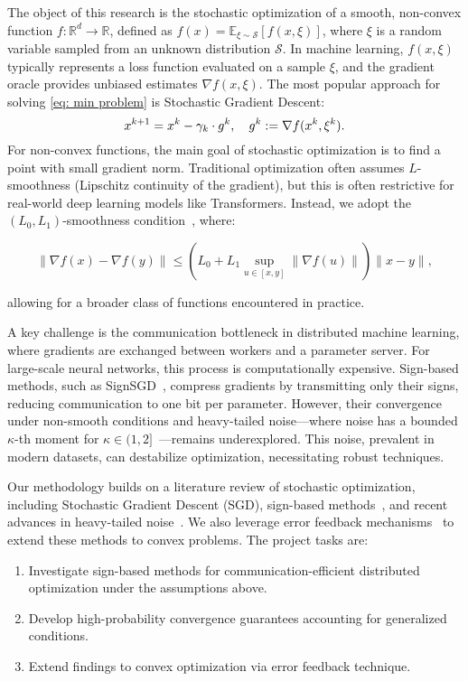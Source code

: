 The object of this research is the stochastic optimization of a smooth, non-convex function $f: \mathbb{R}^d \to \mathbb{R}$, defined as $f(x) = \mathbb{E}_{\xi \sim \mathcal{S}} [f(x, \xi)]$, where $\xi$ is a random variable sampled from an unknown distribution $\mathcal{S}$. In machine learning, $f(x, \xi)$ typically represents a loss function evaluated on a sample $\xi$, and the gradient oracle provides unbiased estimates $\nabla f(x, \xi)$.
The most popular approach for solving \eqref{eq: min problem} is Stochastic Gradient Descent:
\begin{equation}
    x^{k+1} = x^k - \gamma_k \cdot  g^k, \quad g^k := \nabla f (x^k, \xi^k). \notag \label{eq: sgd intro}
\end{equation}
For non-convex functions, the main goal of stochastic optimization is to find a point with small gradient norm. Traditional optimization often assumes $L$-smoothness (Lipschitz continuity of the gradient), but this is often restrictive for real-world deep learning models like Transformers. Instead, we adopt the $(L_0, L_1)$-smoothness condition~\cite{gorbunov}, where:

\[
\|\nabla f(x) - \nabla f(y)\| \leq \left(L_0 + L_1 \sup_{u \in [x,y]} \|\nabla f(u)\|\right) \|x - y\|,
\]

allowing for a broader class of functions encountered in practice.

A key challenge is the communication bottleneck in distributed machine learning, where gradients are exchanged between workers and a parameter server. For large-scale neural networks, this process is computationally expensive. Sign-based methods, such as SignSGD~\cite{pmlr-v80-bernstein18a}, compress gradients by transmitting only their signs, reducing communication to one bit per parameter. However, their convergence under non-smooth conditions and heavy-tailed noise—where noise has a bounded $\kappa$-th moment for $\kappa \in (1,2]$~\cite{Kornilov2025}—remains underexplored. This noise, prevalent in modern datasets, can destabilize optimization, necessitating robust techniques.

Our methodology builds on a literature review of stochastic optimization, including Stochastic Gradient Descent (SGD), sign-based methods~\cite{pmlr-v80-bernstein18a}, and recent advances in heavy-tailed noise~\cite{Kornilov2025}. We also leverage error feedback mechanisms~\cite{karimireddy} to extend these methods to convex problems. The project tasks are:

\begin{enumerate}
    \item Investigate sign-based methods for communication-efficient distributed optimization under the assumptions above.
    \item Develop high-probability convergence guarantees accounting for generalized conditions.
    \item Extend findings to convex optimization via error feedback technique.
\end{enumerate}

